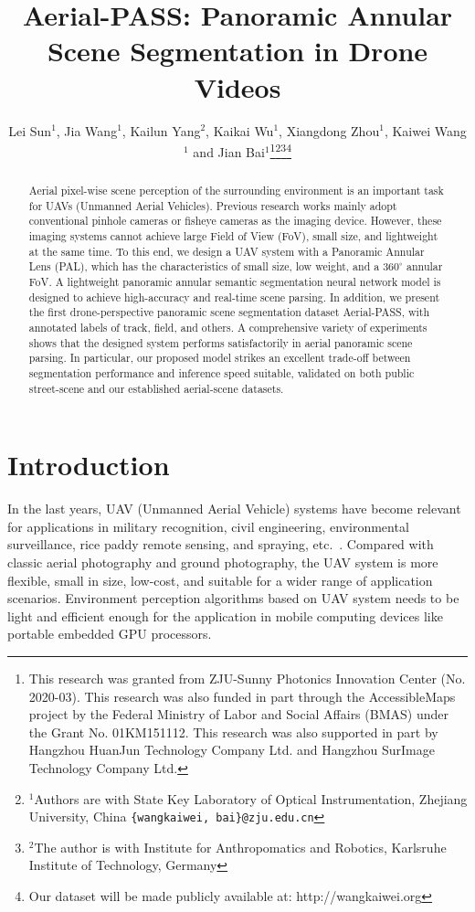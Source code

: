 \documentclass[letterpaper, 10 pt, conference]{ieeeconf}
\title{\LARGE \bf
Aerial-PASS: Panoramic Annular Scene Segmentation in Drone Videos
}
\author{Lei Sun$^{1}$, Jia Wang$^{1}$, Kailun Yang$^{2}$, Kaikai Wu$^{1}$, Xiangdong Zhou$^{1}$, Kaiwei Wang$^{1}$ and Jian Bai$^{1}$\thanks{This research was granted from ZJU-Sunny Photonics Innovation Center (No. 2020-03). This research was also funded in part through the AccessibleMaps project by the Federal Ministry of Labor and Social Affairs (BMAS) under the Grant No. 01KM151112. This research was also supported in part by Hangzhou HuanJun Technology Company Ltd. and Hangzhou SurImage Technology Company Ltd.}\thanks{$^{1}$Authors are with State Key Laboratory of Optical Instrumentation, Zhejiang University, China {\tt \{wangkaiwei, bai\}@zju.edu.cn}}\thanks{$^{2}$The author is with Institute for Anthropomatics and Robotics, Karlsruhe Institute of Technology, Germany}\thanks{Our dataset will be made publicly available at: http://wangkaiwei.org}
}
\begin{document}
\maketitle
\thispagestyle{empty}
\pagestyle{empty}


\begin{abstract}

Aerial pixel-wise scene perception of the surrounding environment is an important task for UAVs (Unmanned Aerial Vehicles).
Previous research works mainly adopt conventional pinhole cameras or fisheye cameras as the imaging device. However, these imaging systems cannot achieve large Field of View (FoV), small size, and lightweight at the same time.
To this end, we design a UAV system with a Panoramic Annular Lens (PAL), which has the characteristics of small size, low weight, and a $360^\circ$ annular FoV.
A lightweight panoramic annular semantic segmentation neural network model is designed to achieve high-accuracy and real-time scene parsing.
In addition, we present the first drone-perspective panoramic scene segmentation dataset Aerial-PASS, with annotated labels of track, field, and others.
A comprehensive variety of experiments shows that the designed system performs satisfactorily in aerial panoramic scene parsing.
In particular, our proposed model strikes an excellent trade-off between segmentation performance and inference speed suitable, validated on both public street-scene and our established aerial-scene datasets.

\end{abstract}


\section{Introduction}

In the last years, UAV (Unmanned Aerial Vehicle) systems have become relevant for applications in military recognition, civil engineering, environmental surveillance, rice paddy remote sensing, and spraying, etc.~\cite{adams2011survey,d2012unmanned}.
Compared with classic aerial photography and ground photography, the UAV system is more flexible, small in size, low-cost, and suitable for a wider range of application scenarios. Environment perception algorithms based on UAV system needs to be light and efficient enough for the application in mobile computing devices like portable embedded GPU processors.
\end{document}
